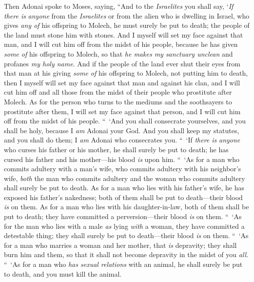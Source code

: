\begin{biblechapter} %
 Then Adonai spoke to Moses, saying,
\verse “And to the \textit{Israelites} you shall say, ‘\textit{If there is} \textit{anyone} from the \textit{Israelites} or from the alien who is dwelling in Israel, who gives \textit{any of} his offspring to Molech, he must surely be put to death; the people of the land must stone him with stones.
\verse And I myself will set my face against that man, and I will cut him off from the midst of his people, because he has given \textit{some of} his offspring to Molech, so that \textit{he makes my sanctuary unclean} and profanes \textit{my holy name}.
\verse And if the people of the land ever shut their eyes from that man at his giving \textit{some of} his offspring to Molech, not putting him to death,
\verse then I myself will set my face against that man and against his clan, and I will cut him off and all those from the midst of their people who prostitute after Molech.
\verse As for the person who turns to the mediums and the soothsayers to prostitute after them, I will set my face against that person, and I will cut him off from the midst of his people.
\verse “ ‘And you shall consecrate yourselves, and you shall be holy, because I \textit{am} Adonai your God.
\verse And you shall keep my statutes, and you shall do them; I \textit{am} Adonai who consecrates you.
 “ ‘If \textit{there is} \textit{anyone} who curses his father or his mother, he shall surely be put to death; he has cursed his father and his mother—his blood \textit{is} upon him.
\verse “ ‘As for a man who commits adultery with a man’s wife, who commits adultery with his neighbor’s wife, \textit{both} the man who commits adultery and the woman who commits adultery shall surely be put to death.
\verse As for a man who lies with his father’s wife, he has exposed his father’s nakedness; both of them shall be put to death—their blood \textit{is} on them.
\verse As for a man who lies with his daughter-in-law, both of them shall be put to death; they have committed a perversion—their blood \textit{is} on them.
\verse “ ‘As for the man who lies with a male \textit{as} lying \textit{with} a woman, they have committed a detestable thing; they shall surely be put to death—their blood \textit{is} on them.
\verse “ ‘As for a man who marries a woman and her mother, that \textit{is} depravity; they shall burn him and them, so that it shall not become depravity in the midst of you \textit{all}.
\verse “ ‘As for a man who \textit{has sexual relations} with an animal, he shall surely be put to death, and you must kill the animal.

\end{biblechapter}
